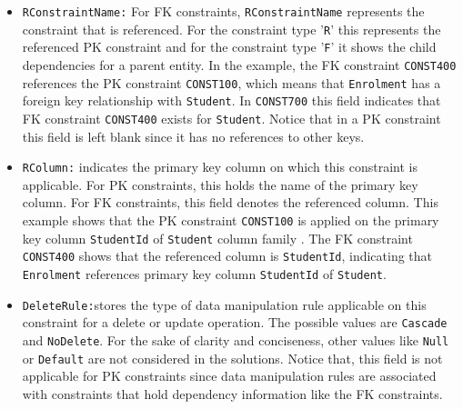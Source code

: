 \begin{itemize}
  \item \texttt{RConstraintName:} For \ac{FK}
  constraints, \texttt{RConstraintName} represents the constraint that is
  referenced. 
  For the constraint type '\texttt{R}' this represents the
  referenced \ac{PK} constraint and for the constraint type '\texttt{F}' it
  shows the child dependencies for a parent entity.
  In the example, the \ac{FK} constraint
  \texttt{CONST400} references the \ac{PK} constraint \texttt{CONST100},  which
  means that \texttt{Enrolment} has a foreign key relationship with
  \texttt{Student}.
   In \texttt{CONST700} this field indicates that \ac{FK} constraint
   \texttt{CONST400} exists for \texttt{Student}. Notice that in a \ac{PK}
   constraint this field is left blank since it has no references to other keys.
  
  \item \texttt{RColumn:}  indicates the primary key column on which this
  constraint is applicable.  For \ac{PK} constraints,  this holds the name of
  the primary key column. For \ac{FK} constraints, this field denotes
  the referenced column.  This example shows that the \ac{PK} constraint
  \texttt{CONST100} is applied on the primary key column \texttt{StudentId} of
  \texttt{Student} column family . The \ac{FK} constraint \texttt{CONST400}
  shows that the referenced column is \texttt{StudentId},  indicating that
  \texttt{Enrolment} references  primary key column \texttt{StudentId} of
  \texttt{Student}.
  
  \item \texttt{DeleteRule:}stores the type of data manipulation rule applicable
  on this constraint for a delete or update operation. The possible values are
  \texttt{Cascade} and \texttt{NoDelete}.   For the sake of
  clarity and conciseness, other values like \texttt{Null} or \texttt{Default}
  are not considered in the solutions. Notice that, this field is not
  applicable for \ac{PK} constraints since data manipulation rules are 
  associated with constraints that hold dependency information like the
  \ac{FK} constraints.
  

  
\end{itemize} 

